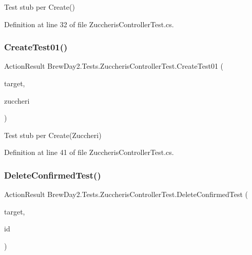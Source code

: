 Test stub per Create()



Definition at line 32 of file Zuccheris\+Controller\+Test.\+cs.

\mbox{\label{class_brew_day2_1_1_tests_1_1_zuccheris_controller_test_a205ddbbeafefb52633a7118f1328b398}} 
\subsubsection{\texorpdfstring{Create\+Test01()}{CreateTest01()}}
{\footnotesize\ttfamily Action\+Result Brew\+Day2.\+Tests.\+Zuccheris\+Controller\+Test.\+Create\+Test01 (\begin{DoxyParamCaption}\item[{\mbox{[}\+Pex\+Assume\+Under\+Test\mbox{]} \mbox{\hyperlink{class_brew_day2_1_1_controllers_1_1_zuccheris_controller}{Zuccheris\+Controller}}}]{target,  }\item[{\mbox{\hyperlink{class_brew_day2_1_1_models_1_1_zuccheri}{Zuccheri}}}]{zuccheri }\end{DoxyParamCaption})}



Test stub per Create(\+Zuccheri)



Definition at line 41 of file Zuccheris\+Controller\+Test.\+cs.

\mbox{\label{class_brew_day2_1_1_tests_1_1_zuccheris_controller_test_af829e12e0a9fc549b7457ab04fc557b7}} 
\subsubsection{\texorpdfstring{Delete\+Confirmed\+Test()}{DeleteConfirmedTest()}}
{\footnotesize\ttfamily Action\+Result Brew\+Day2.\+Tests.\+Zuccheris\+Controller\+Test.\+Delete\+Confirmed\+Test (\begin{DoxyParamCaption}\item[{\mbox{[}\+Pex\+Assume\+Under\+Test\mbox{]} \mbox{\hyperlink{class_brew_day2_1_1_controllers_1_1_zuccheris_controller}{Zuccheris\+Controller}}}]{target,  }\item[{int}]{id }\end{DoxyParamCaption})}



